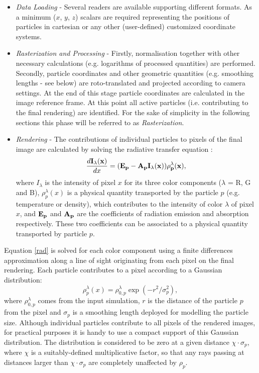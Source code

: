 \documentclass[11pt]{article}
\begin{document}
\begin{itemize}
\item
{\it Data Loading} - Several readers are available supporting different formats. As a minimum ($x$, $y$, $z$) scalars are required representing the positions of particles in cartesian or any other (user-defined) customized coordinate systems.
\item
{\it Rasterization and Processing} - Firstly, normalisation together with other necessary 
calculations (e.g. logarithms of processed quantities) are performed. Secondly, particle 
coordinates and other geometric quantities (e.g. smoothing lengths - see below) are 
roto-translated and projected according to camera settings. At the end of this
stage particle coordinates are calculated in the image reference frame. %
At this point all active 
particles (i.e. contributing to the final rendering) are identified.
For the sake of simplicity in the following sections 
this phase will be referred to as {\it Rasterization}.
\item
{\it Rendering} - The contributions of individual particles to pixels of the final 
image are calculated by solving the radiative transfer equation  \cite{1991par..book.....S}:
\begin{equation}\label{rad}
\frac{d\bf{I_{\lambda}}(x)}{dx}=(\bf{E}_p-\bf{A}_p\bf{I_{\lambda}}(x))\rho_p^{\lambda}(x),
\end{equation}
where $I_{\lambda}$ is the intensity of pixel $x$ for its three color components ($\lambda$ = R, G and B), $\rho_p^{\lambda}(x)$ is a physical quantity transported by the particle $p$ 
(e.g. temperature or density),
which contributes to the intensity of color $\lambda$ of pixel $x$, and $\bf{E}_p$ and $\bf{A}_p$
are the coefficients of radiation emission and absorption respectively. These two coefficients 
can be associated to a physical quantity transported by particle $p$.%
\end{itemize}
Equation \eqref{rad} is solved for each color component using a finite differences 
approximation along a line of sight originating from each pixel on the final rendering. Each 
particle contributes to a pixel according to a Gaussian distribution:
\begin{equation}\label{smooth}
\rho_p^{\lambda}(x)=\rho_{0,p}^{\lambda}\exp(-r^2/\sigma_p^2),
\end{equation}
where $\rho_{0,p}^{\lambda}$ comes from the input simulation, 
$r$ is the distance of the particle $p$ from the pixel and 
$\sigma_p$ is a smoothing length deployed for modelling the particle size. 
Although individual particles contribute to all pixels of the rendered images, 
for practical purposes it is handy to use a compact support of this
Gaussian distribution. The distribution is considered to be zero at a given
distance $\chi\cdot\sigma_p$, where $\chi$ is a suitably-defined multiplicative factor, so that any rays passing at distances larger than $\chi\cdot\sigma_p$ are completely unaffected by $\rho_p$.
\end{document}
